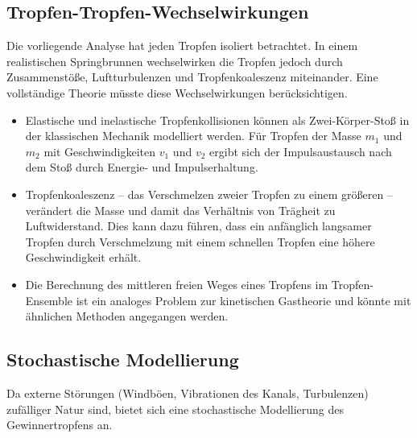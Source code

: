 ﻿\documentclass[a4paper,12pt]{article}
\theoremstyle{definition}
\begin{document}
\subsection{Tropfen-Tropfen-Wechselwirkungen}

Die vorliegende Analyse hat jeden Tropfen isoliert betrachtet. In einem realistischen
Springbrunnen wechselwirken die Tropfen jedoch durch Zusammenstöße, Luftturbulenzen
und Tropfenkoaleszenz miteinander. Eine vollständige Theorie müsste diese
Wechselwirkungen berücksichtigen.

\begin{itemize}
    \item Elastische und inelastische Tropfenkollisionen können als Zwei-Körper-Stoß
          in der klassischen Mechanik modelliert werden. Für Tropfen der Masse $m_1$
          und $m_2$ mit Geschwindigkeiten $v_1$ und $v_2$ ergibt sich der Impulsaustausch
          nach dem Stoß durch Energie- und Impulserhaltung.
    \item Tropfenkoaleszenz -- das Verschmelzen zweier Tropfen zu einem größeren --
          verändert die Masse und damit das Verhältnis von Trägheit zu Luftwiderstand.
          Dies kann dazu führen, dass ein anfänglich langsamer Tropfen durch Verschmelzung
          mit einem schnellen Tropfen eine höhere Geschwindigkeit erhält.
    \item Die Berechnung des mittleren freien Weges eines Tropfens im Tropfen-Ensemble
          ist ein analoges Problem zur kinetischen Gastheorie und könnte mit ähnlichen
          Methoden angegangen werden.
\end{itemize}

\subsection{Stochastische Modellierung}

Da externe Störungen (Windböen, Vibrationen des Kanals, Turbulenzen) zufälliger Natur sind,
bietet sich eine stochastische Modellierung des Gewinnertropfens an.
\end{document}
